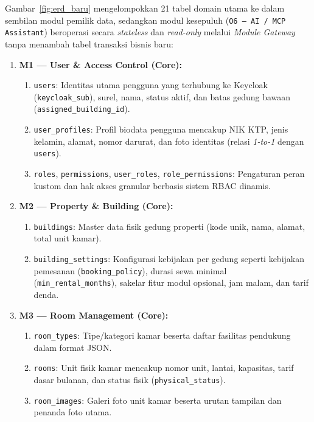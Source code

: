 Gambar~\ref{fig:erd_baru} mengelompokkan 21 tabel domain utama ke dalam sembilan modul pemilik data, sedangkan modul kesepuluh (\texttt{O6 --- AI / MCP Assistant}) beroperasi secara \textit{stateless} dan \textit{read-only} melalui \textit{Module Gateway} tanpa menambah tabel transaksi bisnis baru:
\begin{enumerate}[label=\arabic*., leftmargin=*]
  \item \textbf{M1 --- User \& Access Control (Core):}
    \begin{enumerate}[label=\alph*., leftmargin=*]
      \item \texttt{users}: Identitas utama pengguna yang terhubung ke Keycloak (\texttt{keycloak\_sub}), surel, nama, status aktif, dan batas gedung bawaan (\texttt{assigned\_building\_id}).
      \item \texttt{user\_profiles}: Profil biodata pengguna mencakup NIK KTP, jenis kelamin, alamat, nomor darurat, dan foto identitas (relasi \textit{1-to-1} dengan \texttt{users}).
      \item \texttt{roles}, \texttt{permissions}, \texttt{user\_roles}, \texttt{role\_permissions}: Pengaturan peran kustom dan hak akses granular berbasis sistem RBAC dinamis.
    \end{enumerate}
  \item \textbf{M2 --- Property \& Building (Core):}
    \begin{enumerate}[label=\alph*., leftmargin=*]
      \item \texttt{buildings}: Master data fisik gedung properti (kode unik, nama, alamat, total unit kamar).
      \item \texttt{building\_settings}: Konfigurasi kebijakan per gedung seperti kebijakan pemesanan (\texttt{booking\_policy}), durasi sewa minimal (\texttt{min\_rental\_months}), sakelar fitur modul opsional, jam malam, dan tarif denda.
    \end{enumerate}
  \item \textbf{M3 --- Room Management (Core):}
    \begin{enumerate}[label=\alph*., leftmargin=*]
      \item \texttt{room\_types}: Tipe/kategori kamar beserta daftar fasilitas pendukung dalam format JSON.
      \item \texttt{rooms}: Unit fisik kamar mencakup nomor unit, lantai, kapasitas, tarif dasar bulanan, dan status fisik (\texttt{physical\_status}).
      \item \texttt{room\_images}: Galeri foto unit kamar beserta urutan tampilan dan penanda foto utama.

\end{enumerate}
\end{enumerate}
